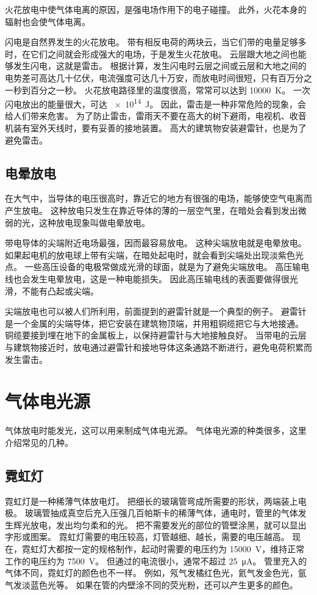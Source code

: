 火花放电中使气体电离的原因，是强电场作用下的电子碰撞。
此外，火花本身的辐射也会使气体电离。

闪电是自然界发生的火花放电。
带有相反电荷的两块云，当它们带的电量足够多时，在它们之间就会形成强大的电场，于是发生火花放电。
云层跟大地之间也能够发生闪电，这就是雷击。
根据计算，发生闪电时云层之间或云层和大地之间的电势差可高达几十亿伏，电流强度可达几十万安，而放电时间很短，只有百万分之一秒到百分之一秒。
火花放电路径里的温度很高，常常可以达到 \qty{10000}{K}。
一次闪电放出的能量很大，可达 \qty{e14}{J}。
因此，雷击是一种非常危险的现象，会给人们带来危害。
为了防止雷击，雷雨天不要在高大的树下避雨，电视机、收音机装有室外天线时，要有妥善的接地装置。
高大的建筑物安装避雷针，也是为了避免雷击。

\subsection{电晕放电}
在大气中，当导体的电压很高时，靠近它的地方有很强的电场，能够使空气电离而产生放电。
这种放电只发生在靠近导体的薄的一层空气里，在暗处会看到发出微弱的光，这种放电现象叫做电晕放电。

带电导体的尖端附近电场最强，因而最容易放电。
这种尖端放电就是电晕放电。
如果起电机的放电球上带有尖端，在暗处起电时，就会看到尖端处出现淡紫色光点。
一些高压设备的电极常做成光滑的球面，就是为了避免尖端放电。
高压输电线也会发生电晕放电，这是一种电能损失。
因此高压输电线的表面要做得很光滑，不能有凸起或尖端。

尖端放电也可以被人们所利用，前面提到的避雷针就是一个典型的例子。
避雷针是一个金属的尖端导体，把它安装在建筑物顶端，并用粗铜缆把它与大地接通。
铜缆要接到埋在地下的金属板上，以保持避雷针与大地接触良好。
当带电的云层与建筑物接近时，放电通过避雷针和接地导体这条通路不断进行，避免电荷积累而发生雷击。

\section{气体电光源}
气体放电时能发光，这可以用来制成气体电光源。
气体电光源的种类很多，这里介绍常见的几种。

\subsection{霓虹灯}
霓虹灯是一种稀薄气体放电灯。
把细长的玻璃管弯成所需要的形状，两端装上电极。
玻璃管抽成真空后充入压强几百帕斯卡的稀薄气体，通电时，管里的气体发生辉光放电，发出均匀柔和的光。
把不需要发光的部位的管壁涂黑，就可以显出字形或图案。
霓虹灯需要的电压较高，灯管越细、越长，需要的电压越高。
现在，霓虹灯大都按一定的规格制作，起动时需要的电压约为 \qty{15000}{V}，维持正常工作的电压约为 \qty{7500}{V}。
但通过的电流很小，通常不超过 \qty{25}{\micro A}。
管里充入的气体不同，霓虹灯的颜色也不一样。
例如，氖气发橘红色光，氦气发金色光，氩气发淡蓝色光等。
如果在管的内壁涂不同的荧光粉，还可以产生更多的颜色。

